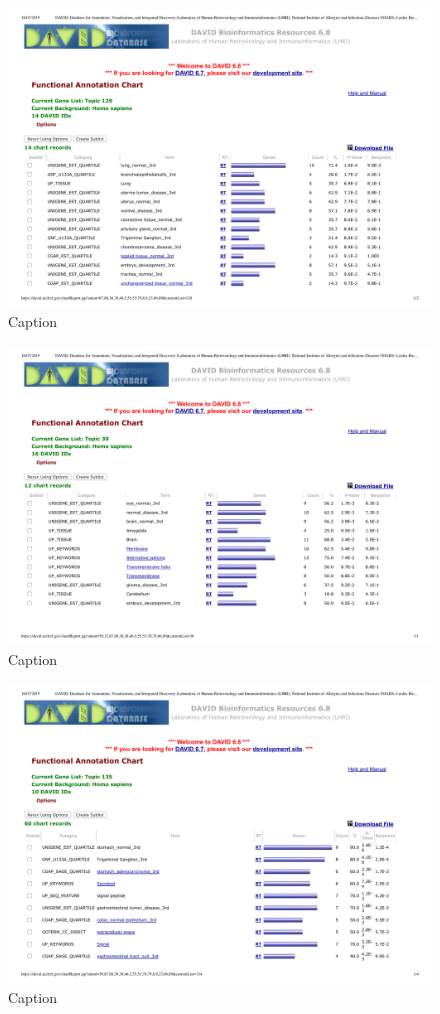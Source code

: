 \begin{figure}[htbp!]
    \centering
    \includegraphics[width=0.6\linewidth]{pictures/topic/merged/DAVID_lung.pdf}
    \caption{Caption}
    \label{fig:topic/merged/DAVID_lung}
\end{figure}

\begin{figure}[htbp!]
    \centering
    \includegraphics[width=0.6\linewidth]{pictures/topic/merged/DAVID_brain.pdf}
    \caption{Caption}
    \label{fig:topic/merged/DAVID_brain}
\end{figure}

\begin{figure}[htbp!]
    \centering
    \includegraphics[width=0.6\linewidth]{pictures/topic/merged/DAVID_stomach.pdf}
    \caption{Caption}
    \label{fig:topic/merged/DAVID_stomach}
\end{figure}